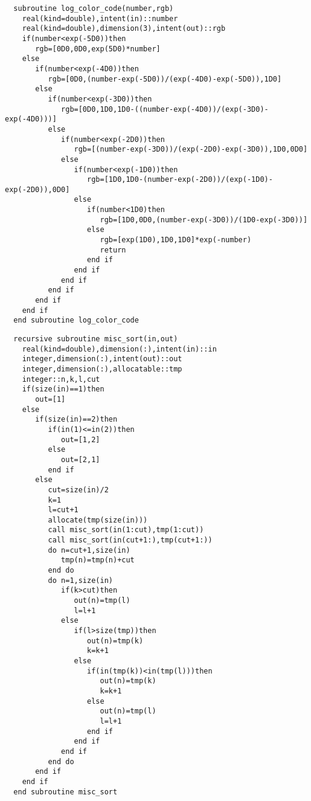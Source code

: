 \begin{Verbatim}
  subroutine log_color_code(number,rgb)
    real(kind=double),intent(in)::number
    real(kind=double),dimension(3),intent(out)::rgb
    if(number<exp(-5D0))then
       rgb=[0D0,0D0,exp(5D0)*number]
    else
       if(number<exp(-4D0))then
          rgb=[0D0,(number-exp(-5D0))/(exp(-4D0)-exp(-5D0)),1D0]
       else
          if(number<exp(-3D0))then
             rgb=[0D0,1D0,1D0-((number-exp(-4D0))/(exp(-3D0)-exp(-4D0)))]
          else
             if(number<exp(-2D0))then
                rgb=[(number-exp(-3D0))/(exp(-2D0)-exp(-3D0)),1D0,0D0]
             else
                if(number<exp(-1D0))then                   
                   rgb=[1D0,1D0-(number-exp(-2D0))/(exp(-1D0)-exp(-2D0)),0D0]
                else
                   if(number<1D0)then
                      rgb=[1D0,0D0,(number-exp(-3D0))/(1D0-exp(-3D0))]
                   else                      
                      rgb=[exp(1D0),1D0,1D0]*exp(-number)
                      return
                   end if
                end if
             end if
          end if
       end if
    end if
  end subroutine log_color_code
\end{Verbatim}

\begin{Verbatim}
  recursive subroutine misc_sort(in,out)
    real(kind=double),dimension(:),intent(in)::in
    integer,dimension(:),intent(out)::out
    integer,dimension(:),allocatable::tmp
    integer::n,k,l,cut
    if(size(in)==1)then
       out=[1]
    else
       if(size(in)==2)then
          if(in(1)<=in(2))then
             out=[1,2]
          else
             out=[2,1]
          end if
       else
          cut=size(in)/2
          k=1
          l=cut+1
          allocate(tmp(size(in)))
          call misc_sort(in(1:cut),tmp(1:cut))
          call misc_sort(in(cut+1:),tmp(cut+1:))
          do n=cut+1,size(in)
             tmp(n)=tmp(n)+cut
          end do
          do n=1,size(in)
             if(k>cut)then
                out(n)=tmp(l)
                l=l+1
             else
                if(l>size(tmp))then
                   out(n)=tmp(k)
                   k=k+1
                else
                   if(in(tmp(k))<in(tmp(l)))then
                      out(n)=tmp(k)
                      k=k+1
                   else
                      out(n)=tmp(l)
                      l=l+1
                   end if
                end if
             end if
          end do
       end if
    end if
  end subroutine misc_sort
\end{Verbatim}
